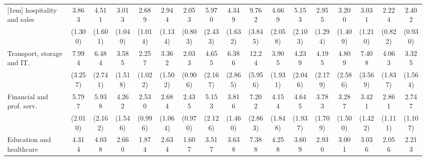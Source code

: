 {\begin{tabular}{l*{16}{c}}
[1em]
hospitality and sales&       3.863\sym{***}&       4.511\sym{***}&       3.013\sym{**} &       2.689\sym{**} &       2.944\sym{**} &       2.053         &       5.970\sym{***}&       4.349\sym{***}&       9.762\sym{***}&       4.669\sym{***}&       5.153\sym{***}&       2.955\sym{*}  &       3.200\sym{**} &       3.031\sym{**} &       2.224\sym{*}  &       2.402\sym{*}  \\
                    &     (1.300)         &     (1.601)         &     (1.049)         &     (1.014)         &     (1.134)         &     (0.803)         &     (2.433)         &     (1.632)         &     (3.845)         &     (2.058)         &     (2.103)         &     (1.294)         &     (1.409)         &     (1.210)         &     (0.822)         &     (0.930)         \\
[1em]
Transport, storage and IT.&       7.994\sym{***}&       6.484\sym{***}&       3.585\sym{**} &       2.257         &       3.362\sym{**} &       2.033         &       4.655\sym{***}&       6.386\sym{***}&       12.24\sym{***}&       3.905\sym{**} &       4.239\sym{**} &       4.195\sym{**} &       4.809\sym{**} &       7.408\sym{***}&       4.063\sym{**} &       3.325\sym{*}  \\
                    &     (3.257)         &     (2.741)         &     (1.518)         &     (1.022)         &     (1.502)         &     (0.906)         &     (2.167)         &     (2.865)         &     (5.956)         &     (1.931)         &     (2.046)         &     (2.179)         &     (2.586)         &     (3.569)         &     (1.837)         &     (1.564)         \\
[1em]
Financial and prof. serv.&       5.797\sym{***}&       5.938\sym{***}&       4.262\sym{***}&       2.530\sym{*}  &       2.684\sym{*}  &       2.435\sym{*}  &       5.153\sym{***}&       3.816\sym{***}&       7.202\sym{***}&       4.154\sym{**} &       4.645\sym{***}&       3.783\sym{**} &       3.287\sym{**} &       3.421\sym{**} &       2.861\sym{**} &       2.747\sym{*}  \\
                    &     (2.010)         &     (2.162)         &     (1.546)         &     (0.996)         &     (1.064)         &     (0.970)         &     (2.126)         &     (1.460)         &     (2.863)         &     (1.848)         &     (1.937)         &     (1.709)         &     (1.500)         &     (1.422)         &     (1.111)         &     (1.107)         \\
[1em]
Education and healthcare&       4.314\sym{***}&       4.038\sym{***}&       2.660\sym{**} &       1.874         &       2.634\sym{*}  &       1.607         &       3.517\sym{**} &       3.638\sym{***}&       7.388\sym{***}&       4.258\sym{**} &       3.609\sym{**} &       2.930\sym{*}  &       3.001\sym{*}  &       3.036\sym{**} &       2.056         &       2.213\sym{*}  \\

\end{tabular}}

